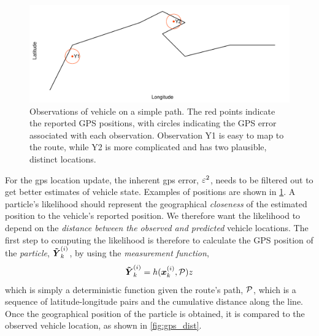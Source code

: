 \begin{knitrout}\small
{}\color{fgcolor}\begin{figure}
\includegraphics[width=\maxwidth]{figure/lhood_obs-1} \caption[Observations of vehicle on a simple path]{Observations of vehicle on a simple path. The red points indicate the reported GPS positions, with circles indicating the GPS error associated with each observation. Observation Y1 is easy to map to the route, while Y2 is more complicated and has two plausible, distinct locations.}\label{fig:lhood_obs}
\end{figure}


\end{knitrout}





For the \gls{gps} location update, the inherent \gls{gps} error, $\varepsilon^2$, needs to be filtered out to get better estimates of vehicle state. Examples of positions are shown in \cref{fig:lhood_obs}. A particle's likelihood should represent the geographical \emph{closeness} of the estimated position to the vehicle's reported position. We therefore want the likelihood to depend on the \emph{distance between the observed and predicted} vehicle locations. The first step to computing the likelihood is therefore
to calculate the GPS position of the \emph{particle}, $\boldsymbol{\tilde Y}^{(i)}_k$, by using the \emph{measurement function},
\begin{equation}
\label{eq:pf_measurement_fun}
\boldsymbol{\tilde Y}^{(i)}_k = h(\boldsymbol x^{(i)}_k, \mathcal{P})z
\end{equation}
which is simply a deterministic function given the route's path, $\mathcal{P}$, which is a sequence of latitude-longitude pairs and the cumulative distance along the line. Once the geographical position of the particle is obtained, it is compared to the observed vehicle location, as shown in \cref{fig:gps_dist}.

